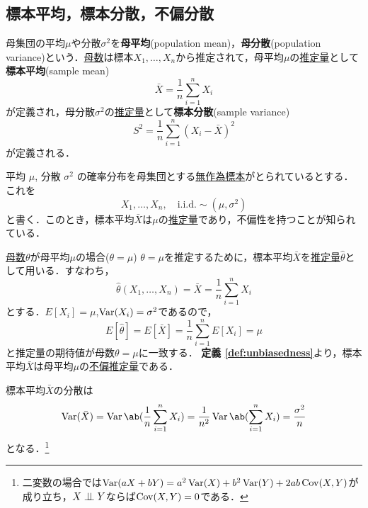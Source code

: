 \documentclass[main.tex]{subfiles}
\begin{document}
\subsection{標本平均，標本分散，不偏分散}
母集団の平均$\mu$や分散$\sigma^2$を\textbf{母平均}(population mean)，\textbf{母分散}(population variance)という．\hyperlink{def:parameter}{母数}は標本$X_1, \dots, X_n$から推定されて，母平均$\mu$の\hyperlink{def:estimator}{推定量}として\textbf{標本平均}(sample mean)
\begin{equation}
  \bar{X} = \frac{1}{n} \sum_{i=1}^{n} X_i
\end{equation}
が定義され，母分散$\sigma^2$の\hyperlink{def:estimator}{推定量}として\textbf{標本分散}(sample variance)
\begin{equation}
  S^2 = \frac{1}{n} \sum_{i=1}^{n} (X_i - \bar{X})^2
\end{equation}
が定義される．

平均 $\mu$, 分散 $\sigma^2$ の確率分布を母集団とする\hyperref[def:random_sample]{無作為標本}がとられているとする．これを
\begin{equation}
    X_1, \dots, X_n, \quad \text{i.i.d.} \sim (\mu, \sigma^2)
    \label{eq:random_sample_general}
\end{equation}
と書く．このとき，標本平均$\bar{X}$は$\mu$の\hyperlink{def:estimator}{推定量}であり，不偏性を持つことが知られている．

\begin{myexample}{\hyperlink{def:parameter}{母数}$\theta$が母平均$\mu$の場合($\theta=\mu$)}
\label{ex:unbiased_sample_mean} %
  $\theta=\mu$を推定するために，標本平均$\bar{X}$を\hyperlink{def:estimator}{推定量}$\hat{\theta}$として用いる．すなわち，
  \begin{equation}
    \hat{\theta} (X_1, \dots, X_n) = \bar{X} = \frac{1}{n} \sum_{i=1}^{n} X_i
  \end{equation}
とする．$E[X_i] = \mu$,$\operatorname{Var}(X_i) = \sigma^2$であるので，
\begin{equation}
  E[\hat{\theta}] = E[\bar{X}] =  \frac{1}{n} \sum_{i=1}^{n} E[X_i]  = \mu 
\end{equation}
と推定量の期待値が母数$\theta=\mu$に一致する．
\textbf{定義 \ref{def:unbiasedness}}より，標本平均$\bar{X}$は母平均$\mu$の\hyperref[def:unbiasedness]{不偏推定量}である．
\end{myexample}
標本平均$\bar{X}$の分散は
\begin{equation}
  \Var(\bar{X}) = \Var\ab(\frac{1}{n} \sum_{i=1}^{n} X_i) = \frac{1}{n^2}  \Var\ab(\sum_{i=1}^{n}X_i) = \frac{\sigma^2}{n}
\end{equation}
となる．\footnote{二変数の場合では$\operatorname{Var}(aX+bY) = a^2\operatorname{Var}(X) + b^2\operatorname{Var}(Y) + 2ab\operatorname{Cov}(X,Y)$が成り立ち，$X \perp\!\!\!\perp Y$ならば$\operatorname{Cov}(X,Y)=0$である．}
\end{document}
